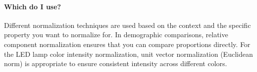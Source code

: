 \documentclass{ximera}
\begin{document}
\paragraph{Which do I use?}
Different normalization techniques are used based on the context and
the specific property you want to normalize for. In demographic
comparisons, relative component normalization ensures that you can
compare proportions directly. For the LED lamp color intensity
normalization, unit vector normalization (Euclidean norm) is
appropriate to ensure consistent intensity across different colors.


 



\end{document}
